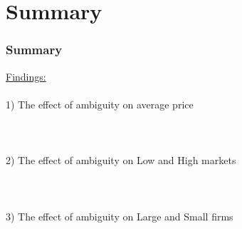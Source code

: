 \documentclass[red]{beamer}
\begin{document}
\section{Summary}
\begin{frame} [t]
\frametitle{Summary}
\underline{Findings:} \\~\\
\hspace*{20pt} 1) The effect of ambiguity on average price \\~\\ \\~\\  

\hspace*{20pt} 2) The effect of ambiguity on Low and High markets \\~\\ \\~\\ 

\hspace*{20pt} 3) The effect of ambiguity on Large and Small firms \\~\\ \\~\\ 
\end{frame}





\begin{frame} [t]
\frametitle{}
\vspace*{80pt}
\end{frame}
\end{document}
